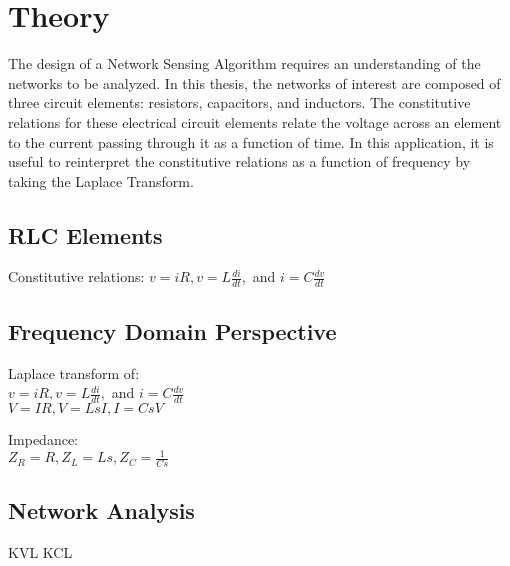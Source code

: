 \chapter{Theory}
The design of a Network Sensing Algorithm requires an understanding of the networks to be analyzed.
In this thesis, the networks of interest are composed of three circuit elements: resistors, capacitors, and inductors.
The constitutive relations for these electrical circuit elements relate the voltage across an element to the current passing through it as a function of time.
In this application, it is useful to reinterpret the constitutive relations as a function of frequency by taking the Laplace Transform.


\section{RLC Elements}

Constitutive relations:
$v=iR, v=L\frac{di}{dt},$ and $i=C\frac{dv}{dt}$

\section{Frequency Domain Perspective}

Laplace transform of:\\
$v=iR, v=L\frac{di}{dt},$ and $i=C\frac{dv}{dt}$\\
$V=IR, V=LsI, I=CsV$

Impedance:\\
$Z_R=R, Z_L=Ls, Z_C=\frac{1}{Cs}$

\section{Network Analysis}

KVL
KCL
